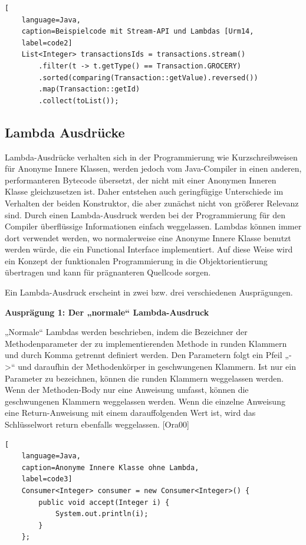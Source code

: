 \begin{lstlisting}[
    language=Java,
    caption=Beispielcode mit Stream-API und Lambdas [Urm14,
    label=code2]
	List<Integer> transactionsIds = transactions.stream()
		.filter(t -> t.getType() == Transaction.GROCERY)
		.sorted(comparing(Transaction::getValue).reversed())
		.map(Transaction::getId)
		.collect(toList());
\end{lstlisting}  
\subsection{Lambda Ausdrücke} \label{sec:javaLambda}
Lambda-Ausdrücke verhalten sich in der Programmierung wie Kurzschreibweisen für Anonyme Innere Klassen, werden jedoch vom Java-Compiler in einen anderen, performanteren Bytecode übersetzt, der nicht mit einer Anonymen Inneren Klasse gleichzusetzen ist. Daher entstehen auch geringfügige Unterschiede im Verhalten der beiden Konstruktor, die aber zunächst nicht von größerer Relevanz sind. Durch einen Lambda-Ausdruck werden bei der Programmierung für den Compiler überflüssige Informationen einfach weggelassen. Lambdas können immer dort verwendet werden, wo normalerweise eine Anonyme Innere Klasse benutzt werden würde, die ein Functional Interface implementiert. Auf diese Weise wird ein Konzept der funktionalen Programmierung in die Objektorientierung übertragen und kann für prägnanteren Quellcode sorgen.

Ein Lambda-Ausdruck erscheint in zwei bzw. drei verschiedenen Ausprägungen.

\textbf{Ausprägung 1: Der „normale“ Lambda-Ausdruck}

„Normale“ Lambdas werden beschrieben, indem die Bezeichner der Methodenparameter der zu implementierenden Methode in runden Klammern und durch Komma getrennt definiert werden. Den Parametern folgt ein Pfeil „->“ und daraufhin der Methodenkörper in geschwungenen Klammern. Ist nur ein Parameter zu bezeichnen, können die runden Klammern weggelassen werden. Wenn der Methoden-Body nur eine Anweisung umfasst, können die geschwungenen Klammern weggelassen werden. Wenn die einzelne Anweisung eine Return-Anweisung mit einem darauffolgenden Wert ist, wird das Schlüsselwort return ebenfalls weggelassen. [Ora00]

\begin{lstlisting}[
    language=Java,
    caption=Anonyme Innere Klasse ohne Lambda,
    label=code3]
	Consumer<Integer> consumer = new Consumer<Integer>() {
		public void accept(Integer i) {
			System.out.println(i);
		}
	};
\end{lstlisting}  

